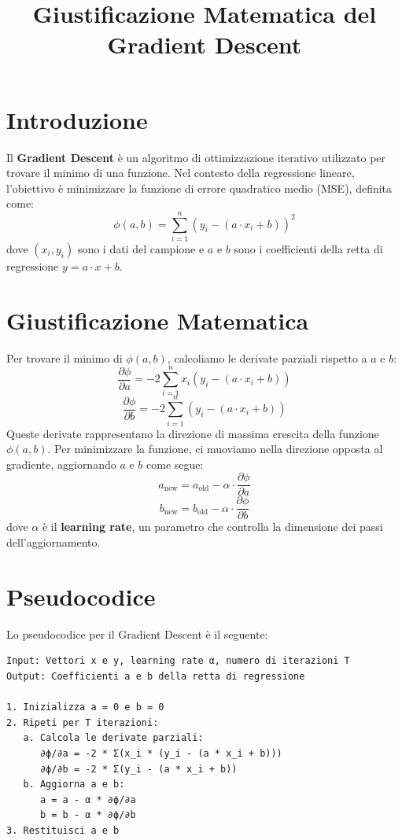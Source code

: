 \documentclass{article}
\title{Giustificazione Matematica del Gradient Descent}
\author{}
\date{}
\begin{document}
\maketitle

\section{Introduzione}
Il \textbf{Gradient Descent} è un algoritmo di ottimizzazione iterativo utilizzato per trovare il minimo di una funzione. Nel contesto della regressione lineare, l'obiettivo è minimizzare la funzione di errore quadratico medio (MSE), definita come:
\[
\phi(a, b) = \sum_{i=1}^n (y_i - (a \cdot x_i + b))^2
\]
dove \((x_i, y_i)\) sono i dati del campione e \(a\) e \(b\) sono i coefficienti della retta di regressione \(y = a \cdot x + b\).

\section{Giustificazione Matematica}
Per trovare il minimo di \(\phi(a, b)\), calcoliamo le derivate parziali rispetto a \(a\) e \(b\):
\[
\frac{\partial \phi}{\partial a} = -2 \sum_{i=1}^n x_i (y_i - (a \cdot x_i + b))
\]
\[
\frac{\partial \phi}{\partial b} = -2 \sum_{i=1}^n (y_i - (a \cdot x_i + b))
\]
Queste derivate rappresentano la direzione di massima crescita della funzione \(\phi(a, b)\). Per minimizzare la funzione, ci muoviamo nella direzione opposta al gradiente, aggiornando \(a\) e \(b\) come segue:
\[
a_{\text{new}} = a_{\text{old}} - \alpha \cdot \frac{\partial \phi}{\partial a}
\]
\[
b_{\text{new}} = b_{\text{old}} - \alpha \cdot \frac{\partial \phi}{\partial b}
\]
dove \(\alpha\) è il \textbf{learning rate}, un parametro che controlla la dimensione dei passi dell'aggiornamento.

\section{Pseudocodice}
Lo pseudocodice per il Gradient Descent è il seguente:

\begin{verbatim}
Input: Vettori x e y, learning rate α, numero di iterazioni T
Output: Coefficienti a e b della retta di regressione

1. Inizializza a = 0 e b = 0
2. Ripeti per T iterazioni:
   a. Calcola le derivate parziali:
      ∂ϕ/∂a = -2 * Σ(x_i * (y_i - (a * x_i + b)))
      ∂ϕ/∂b = -2 * Σ(y_i - (a * x_i + b))
   b. Aggiorna a e b:
      a = a - α * ∂ϕ/∂a
      b = b - α * ∂ϕ/∂b
3. Restituisci a e b
\end{verbatim}
\end{document}
